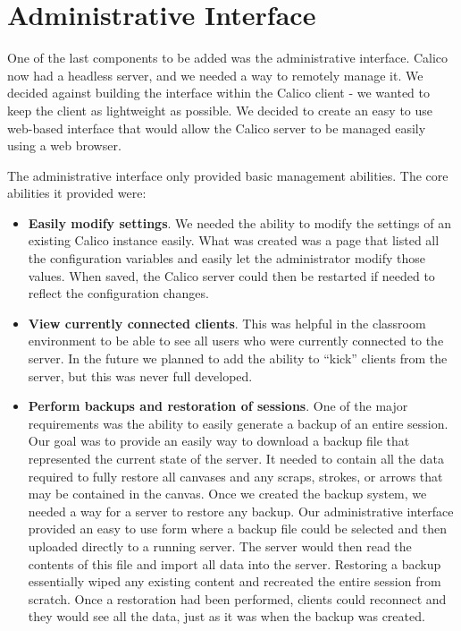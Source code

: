 \section{Administrative Interface}
One of the last components to be added was the administrative interface. Calico now had a headless server, and we needed a way to remotely manage it. We decided against building the interface within the Calico client - we wanted to keep the client as lightweight as possible. 
We decided to create an easy to use web-based interface that would allow the Calico server to be managed easily using a web browser.

The administrative interface only provided basic management abilities. The core abilities it provided were:
\begin{itemize}\itemsep1pt

\item
\textbf{Easily modify settings}.
We needed the ability to modify the settings of an existing Calico instance easily. What was created was a page that listed all the configuration variables and easily let the administrator modify those values. When saved, the Calico server could then be restarted if needed to reflect the configuration changes.

\item
\textbf{View currently connected clients}. 
This was helpful in the classroom environment to be able to see all users who were currently connected to the server. In the future we planned to add the ability to ``kick'' clients from the server, but this was never full developed.

\item
\textbf{Perform backups and restoration of sessions}.
One of the major requirements was the ability to easily generate a backup of an entire session. Our goal was to provide an easily way to download a backup file that represented the current state of the server. It needed to contain all the data required to fully restore all canvases and any scraps, strokes, or arrows that may be contained in the canvas. Once we created the backup system, we needed a way for a server to restore any backup. Our administrative interface provided an easy to use form where a backup file could be selected and then uploaded directly to a running server. The server would then read the contents of this file and import all data into the server. Restoring a backup essentially wiped any existing content and recreated the entire session from scratch. Once a restoration had been performed, clients could reconnect and they would see all the data, just as it was when the backup was created.

\end{itemize}


